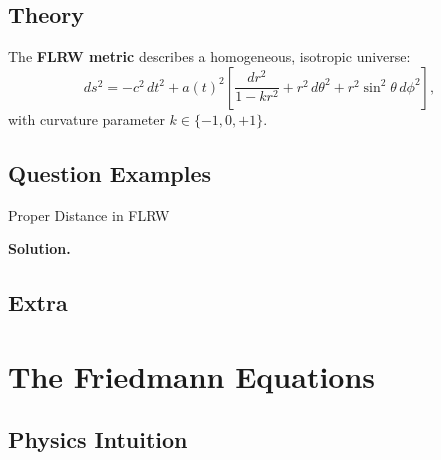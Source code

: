 \documentclass[12pt, a4paper, openright]{report}
\begin{document}
\begin{intuition}
\lipsum[9][1-4]   %
\end{intuition}

\subsection{Theory}

\begin{theory}
The \textbf{FLRW metric} describes a homogeneous, isotropic universe:
\begin{equation}
  ds^2 = -c^2\,dt^2 + a(t)^2
    \!\left[\frac{dr^2}{1-kr^2} + r^2\,d\theta^2 + r^2\!\sin^2\!\theta\,d\phi^2\right],
\end{equation}
with curvature parameter $k\in\{-1,0,+1\}$.

\lipsum[10][1-4]   %
\end{theory}

\subsection{Question Examples}

\begin{example}{Proper Distance in FLRW}{}
\lipsum[11][1-2]   %

\medskip\textbf{Solution.}\quad
\lipsum[11][3-4]   %
\end{example}

\subsection{Extra}

\begin{extra}
\lipsum[12][1-2]   %
\end{extra}

\section{The Friedmann Equations}

\subsection{Physics Intuition}

\begin{intuition}
\lipsum[13][1-4]   %
\end{intuition}
\end{document}
